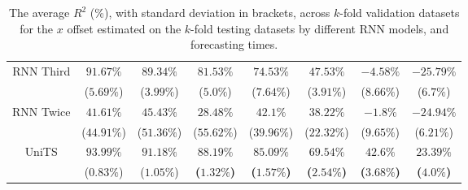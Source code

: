 \begin{table}[!ht]
{\begin{tabular}{|c|c|c|c|c|c|c|c|}
			\multirow{2}{*}{RNN Third} & $91.67\%$ & $89.34\%$ & $81.53\%$ & $74.53\%$ & $47.53\%$ & $-4.58\%$ & $-25.79\%$ \\
			 & ($5.69\%$) & ($3.99\%$) & ($5.0\%$) & ($7.64\%$) & ($3.91\%$) & ($8.66\%$) & ($6.7\%$) \\ \hline
			\multirow{2}{*}{RNN Twice} & $41.61\%$ & $45.43\%$ & $28.48\%$ & $42.1\%$ & $38.22\%$ & $-1.8\%$ & $-24.94\%$ \\
			 & ($44.91\%$) & ($51.36\%$) & ($55.62\%$) & ($39.96\%$) & ($22.32\%$) & ($9.65\%$) & ($6.21\%$) \\ \hline
			\multirow{2}{*}{UniTS} & $93.99\%$ & $91.18\%$ & $\mathbf{88.19\%}$ & $\mathbf{85.09\%}$ & $\mathbf{69.54\%}$ & $\mathbf{42.6\%}$ & $\mathbf{23.39\%}$ \\
			 & ($0.83\%$) & ($1.05\%$) & \textbf{(}$\mathbf{1.32\%}$\textbf{)} & \textbf{(}$\mathbf{1.57\%}$\textbf{)} & \textbf{(}$\mathbf{2.54\%}$\textbf{)} & \textbf{(}$\mathbf{3.68\%}$\textbf{)} & \textbf{(}$\mathbf{4.0\%}$\textbf{)} \\ \hline
		\end{tabular}
	}
	\caption{The average $R^{2}$ (\%), with standard deviation in brackets, across $k$-fold validation datasets for the $x$ offset estimated on the $k$-fold testing datasets by different RNN models, and forecasting times.}
	\label{tab:all_longitude_no_abs_R2}
\end{table}